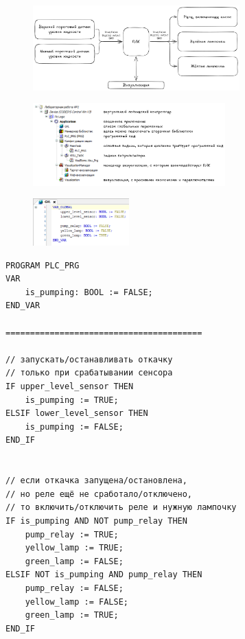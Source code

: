 \documentclass[a4paper]{article}
\begin{document}
\begin{figure}[H]
    \centering
    \includegraphics[width=0.71\textwidth]{sources/структурная схема.png}
\end{figure}
\begin{figure}[H]
    \centering
    \includegraphics[width=0.66\textwidth]{sources/дерево.png}
\end{figure}
\begin{figure}[H]
    \centering
    \includegraphics[width=0.33\textwidth]{sources/глобальные переменные.png}
\end{figure}
\begin{lstlisting}
PROGRAM PLC_PRG
VAR
    is_pumping: BOOL := FALSE;
END_VAR

========================================

// запускать/останавливать откачку 
// только при срабатывании сенсора
IF upper_level_sensor THEN
    is_pumping := TRUE;
ELSIF lower_level_sensor THEN
    is_pumping := FALSE;
END_IF


// если откачка запущена/остановлена,
// но реле ещё не сработало/отключено,
// то включить/отключить реле и нужную лампочку
IF is_pumping AND NOT pump_relay THEN
    pump_relay := TRUE;
    yellow_lamp := TRUE;
    green_lamp := FALSE;
ELSIF NOT is_pumping AND pump_relay THEN
    pump_relay := FALSE;
    yellow_lamp := FALSE;
    green_lamp := TRUE;
END_IF
\end{lstlisting}
\end{document}
